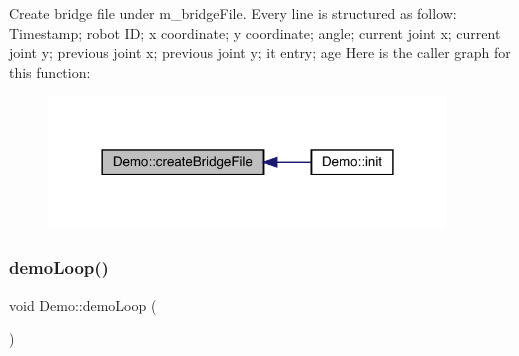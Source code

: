 Create bridge file under m\+\_\+bridge\+File. Every line is structured as follow\+: Timestamp; robot ID; x coordinate; y coordinate; angle; current joint x; current joint y; previous joint x; previous joint y; it entry; age Here is the caller graph for this function\+:\nopagebreak
\begin{figure}[H]
\begin{center}
\leavevmode
\includegraphics[width=298pt]{class_demo_ae0f7fe82aa44b946c13823d408b9ee01_icgraph}
\end{center}
\end{figure}
\mbox{\label{class_demo_a5b12f30547c9f8e89d63ab84bf0cb95f}} 
\subsubsection{\texorpdfstring{demo\+Loop()}{demoLoop()}}
{\footnotesize\ttfamily void Demo\+::demo\+Loop (\begin{DoxyParamCaption}{ }\end{DoxyParamCaption})}

